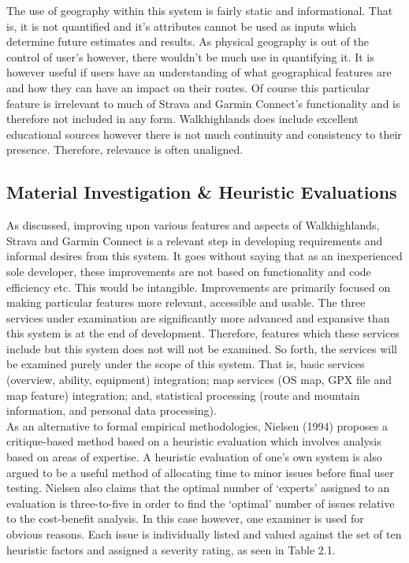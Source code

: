 \documentclass[11pt, english]{article}
\begin{document}
		The use of geography within this system is fairly static and informational. That is, it is not quantified and it's attributes cannot be used as inputs which determine future estimates and results. As physical geography is out of the control of user's however, there wouldn't be much use in quantifying it. It is however useful if users have an understanding of what geographical features are and how they can have an impact on their routes. Of course this particular feature is irrelevant to much of Strava and Garmin Connect's functionality and is therefore not included in any form. Walkhighlands does include excellent educational sources however there is not much continuity and consistency to their presence. Therefore, relevance is often unaligned.

	\subsection{Material Investigation \& Heuristic Evaluations}

	As discussed, improving upon various features and aspects of Walkhighlands, Strava and Garmin Connect is a relevant step in developing requirements and informal desires from this system. It goes without saying that as an inexperienced sole developer, these improvements are not based on functionality and code efficiency etc. This would be intangible. Improvements are primarily focused on making particular features more relevant, accessible and usable. The three services under examination are significantly more advanced and expansive than this system is at the end of development. Therefore, features which these services include but this system does not will not be examined. So forth, the services will be examined purely under the scope of this system. That is, basic services (overview, ability, equipment) integration; map services (OS map, GPX file and map feature) integration; and, statistical processing (route and mountain information, and personal data processing).\\

	As an alternative to formal empirical methodologies, Nielsen (1994) proposes a critique-based method based on a heuristic evaluation which involves analysis based on areas of expertise. A heuristic evaluation of one's own system is also argued to be a useful method of allocating time to minor issues before final user testing. Nielsen also claims that the optimal number of `experts' assigned to an evaluation is three-to-five in order to find the `optimal' number of issues relative to the cost-benefit analysis. In this case however, one examiner is used for obvious reasons. Each issue is individually listed and valued against the set of ten heuristic factors and assigned a severity rating, as seen in Table 2.1.\\
\end{document}
